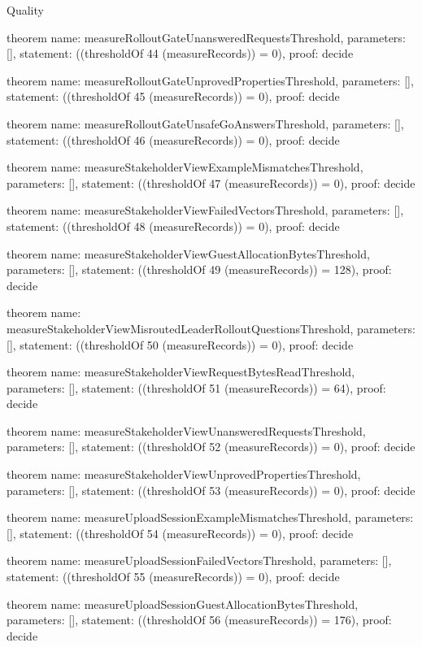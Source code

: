 \begin{lexlean}{Quality}
\begin{semanticmodule}
theorem{
  name: measureRolloutGateUnansweredRequestsThreshold,
  parameters: [],
  statement: ((thresholdOf 44 (measureRecords)) = 0),
  proof: decide{}
}

theorem{
  name: measureRolloutGateUnprovedPropertiesThreshold,
  parameters: [],
  statement: ((thresholdOf 45 (measureRecords)) = 0),
  proof: decide{}
}

theorem{
  name: measureRolloutGateUnsafeGoAnswersThreshold,
  parameters: [],
  statement: ((thresholdOf 46 (measureRecords)) = 0),
  proof: decide{}
}

theorem{
  name: measureStakeholderViewExampleMismatchesThreshold,
  parameters: [],
  statement: ((thresholdOf 47 (measureRecords)) = 0),
  proof: decide{}
}

theorem{
  name: measureStakeholderViewFailedVectorsThreshold,
  parameters: [],
  statement: ((thresholdOf 48 (measureRecords)) = 0),
  proof: decide{}
}

theorem{
  name: measureStakeholderViewGuestAllocationBytesThreshold,
  parameters: [],
  statement: ((thresholdOf 49 (measureRecords)) = 128),
  proof: decide{}
}

theorem{
  name: measureStakeholderViewMisroutedLeaderRolloutQuestionsThreshold,
  parameters: [],
  statement: ((thresholdOf 50 (measureRecords)) = 0),
  proof: decide{}
}

theorem{
  name: measureStakeholderViewRequestBytesReadThreshold,
  parameters: [],
  statement: ((thresholdOf 51 (measureRecords)) = 64),
  proof: decide{}
}

theorem{
  name: measureStakeholderViewUnansweredRequestsThreshold,
  parameters: [],
  statement: ((thresholdOf 52 (measureRecords)) = 0),
  proof: decide{}
}

theorem{
  name: measureStakeholderViewUnprovedPropertiesThreshold,
  parameters: [],
  statement: ((thresholdOf 53 (measureRecords)) = 0),
  proof: decide{}
}

theorem{
  name: measureUploadSessionExampleMismatchesThreshold,
  parameters: [],
  statement: ((thresholdOf 54 (measureRecords)) = 0),
  proof: decide{}
}

theorem{
  name: measureUploadSessionFailedVectorsThreshold,
  parameters: [],
  statement: ((thresholdOf 55 (measureRecords)) = 0),
  proof: decide{}
}

theorem{
  name: measureUploadSessionGuestAllocationBytesThreshold,
  parameters: [],
  statement: ((thresholdOf 56 (measureRecords)) = 176),
  proof: decide{}
}


\end{semanticmodule}
\end{lexlean}
